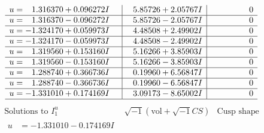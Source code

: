 \documentclass[1p]{elsarticle_modified}
\theoremstyle{definition}
\newcommand{\I}{\sqrt{-1}}
\begin{document}
$$\begin{array}{c|c|c}
\begin{aligned}
u &= \phantom{-}1.316370 + 0.096272 I\end{aligned}
 & \phantom{-}5.85726 + 2.05767 I & \phantom{-0.000000 } 0 \\ \hline\begin{aligned}
u &= \phantom{-}1.316370 - 0.096272 I\end{aligned}
 & \phantom{-}5.85726 - 2.05767 I & \phantom{-0.000000 } 0 \\ \hline\begin{aligned}
u &= -1.324170 + 0.059973 I\end{aligned}
 & \phantom{-}4.48508 + 2.49902 I & \phantom{-0.000000 } 0 \\ \hline\begin{aligned}
u &= -1.324170 - 0.059973 I\end{aligned}
 & \phantom{-}4.48508 - 2.49902 I & \phantom{-0.000000 } 0 \\ \hline\begin{aligned}
u &= \phantom{-}1.319560 + 0.153160 I\end{aligned}
 & \phantom{-}5.16266 + 3.85903 I & \phantom{-0.000000 } 0 \\ \hline\begin{aligned}
u &= \phantom{-}1.319560 - 0.153160 I\end{aligned}
 & \phantom{-}5.16266 - 3.85903 I & \phantom{-0.000000 } 0 \\ \hline\begin{aligned}
u &= \phantom{-}1.288740 + 0.366736 I\end{aligned}
 & \phantom{-}0.19960 + 6.56847 I & \phantom{-0.000000 } 0 \\ \hline\begin{aligned}
u &= \phantom{-}1.288740 - 0.366736 I\end{aligned}
 & \phantom{-}0.19960 - 6.56847 I & \phantom{-0.000000 } 0 \\ \hline\begin{aligned}
u &= -1.331010 + 0.174169 I\end{aligned}
 & \phantom{-}3.09173 - 8.65002 I & \phantom{-0.000000 } 0\\
 \hline 
 \end{array}$$\newpage$$\begin{array}{c|c|c}  
\text{Solutions to }I^u_{1}& \I (\text{vol} + \sqrt{-1}CS) & \text{Cusp shape}\\
 \hline 
\begin{aligned}
u &= -1.331010 - 0.174169 I\end{aligned}

\end{array}$$
\end{document}
